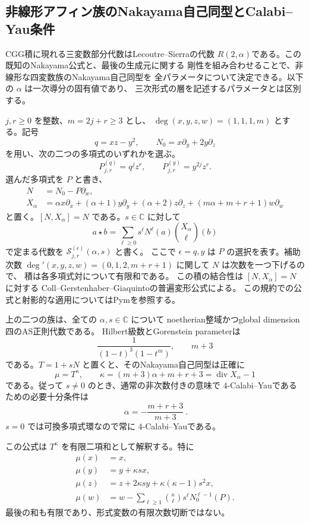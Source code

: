 \subsection{非線形アフィン族のNakayama自己同型とCalabi--Yau条件}
\label{subsec:affine-nakayama-v34}

CGG積に現れる三変数部分代数はLecoutre--Sierraの代数
$R(2,\alpha)$である。この既知のNakayama公式と、最後の生成元に関する
剛性を組み合わせることで、非線形な四変数族のNakayama自己同型を
全パラメータについて決定できる。以下の $\alpha$ は一次導分の固有値であり、
三次形式の層を記述するパラメータとは区別する。

$j,r\ge0$ を整数、$m=2j+r\ge3$ とし、
$\deg(x,y,z,w)=(1,1,1,m)$ とする。記号
\[
 q=xz-y^2,\qquad N_0=x\partial_y+2y\partial_z
\]
を用い、次の二つの多項式のいずれかを選ぶ。
\[
 P^{(q)}_{j,r}=q^jz^r,\qquad
 P^{(y)}_{j,r}=y^{2j}z^r.
\]
選んだ多項式を $P$ と書き、
\begin{align*}
 N&=N_0-P\partial_w,\\
 X_\alpha&=\alpha x\partial_x+(\alpha+1)y\partial_y
       +(\alpha+2)z\partial_z+(m\alpha+m+r+1)w\partial_w
\end{align*}
と置く。$[N,X_\alpha]=N$ である。$s\in\mathbb C$ に対して
\[
 a\star b=\sum_{\ell\ge0}s^\ell N^\ell(a)
                  \binom{X_\alpha}{\ell}(b)
\]
で定まる代数を $\mathcal S_{j,r}^{(\epsilon)}(\alpha,s)$ と書く。
ここで $\epsilon=q,y$ は $P$ の選択を表す。補助次数
$\deg'(x,y,z,w)=(0,1,2,m+r+1)$ に関して $N$ は次数を一つ下げるので、
積は各多項式対について有限和である。
この積の結合性は $[N,X_\alpha]=N$ に対する
Coll--Gerstenhaber--Giaquintoの普遍変形公式による。
この規約での公式と射影的な適用についてはPym\cite[\S3.6, \S4]{Pym}を参照する。

\begin{theorem}[全パラメータのNakayama公式]
\label{thm:affine-nakayama-v34}
上の二つの族は、全ての $\alpha,s\in\mathbb C$ について
noetherian整域かつglobal dimension四のAS正則代数である。
Hilbert級数とGorenstein parameterは
\[
 \frac1{(1-t)^3(1-t^m)},\qquad m+3
\]
である。$T=1+sN$ と置くと、そのNakayama自己同型は正確に
\[
 \boxed{\ \mu=T^{\kappa},\qquad
       \kappa=(m+3)\alpha+m+r+3=\operatorname{div}X_\alpha-1\ }
\]
である。従って $s\ne0$ のとき、通常の非次数付きの意味で
$4$-Calabi--Yauであるための必要十分条件は
\[
 \boxed{\ \alpha=-\frac{m+r+3}{m+3}\ }.
\]
$s=0$ では可換多項式環なので常に $4$-Calabi--Yauである。
\end{theorem}

この公式は $T^\kappa$ を有限二項和として解釈する。特に
\begin{align*}
 \mu(x)&=x,\\
 \mu(y)&=y+\kappa s x,\\
 \mu(z)&=z+2\kappa s y+\kappa(\kappa-1)s^2x,\\
 \mu(w)&=w-\sum_{\ell\ge1}\binom\kappa\ell s^\ell N_0^{\ell-1}(P).
\end{align*}
最後の和も有限であり、形式変数の有限次数切断ではない。

